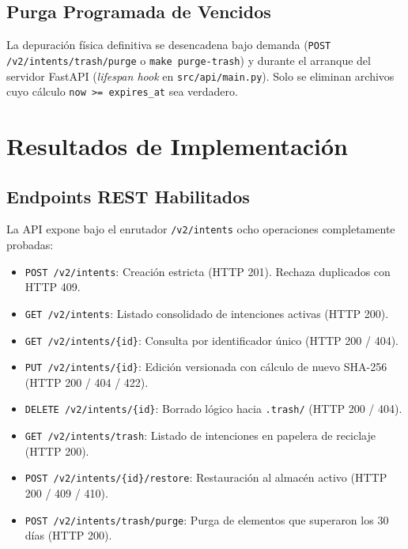 \documentclass[11pt,a4paper]{article}
\begin{document}
\subsection{Purga Programada de Vencidos}
La depuración física definitiva se desencadena bajo demanda (\texttt{POST /v2/intents/trash/purge} o \texttt{make purge-trash}) y durante el arranque del servidor FastAPI (\textit{lifespan hook} en \texttt{src/api/main.py}). Solo se eliminan archivos cuyo cálculo \texttt{now >= expires\_at} sea verdadero.

\section{Resultados de Implementación}

\subsection{Endpoints REST Habilitados}
La API expone bajo el enrutador \texttt{/v2/intents} ocho operaciones completamente probadas:
\begin{itemize}[itemsep=1pt]
    \item \texttt{POST /v2/intents}: Creación estricta (HTTP 201). Rechaza duplicados con HTTP 409.
    \item \texttt{GET /v2/intents}: Listado consolidado de intenciones activas (HTTP 200).
    \item \texttt{GET /v2/intents/\{id\}}: Consulta por identificador único (HTTP 200 / 404).
    \item \texttt{PUT /v2/intents/\{id\}}: Edición versionada con cálculo de nuevo SHA-256 (HTTP 200 / 404 / 422).
    \item \texttt{DELETE /v2/intents/\{id\}}: Borrado lógico hacia \texttt{.trash/} (HTTP 200 / 404).
    \item \texttt{GET /v2/intents/trash}: Listado de intenciones en papelera de reciclaje (HTTP 200).
    \item \texttt{POST /v2/intents/\{id\}/restore}: Restauración al almacén activo (HTTP 200 / 409 / 410).
    \item \texttt{POST /v2/intents/trash/purge}: Purga de elementos que superaron los 30 días (HTTP 200).
\end{itemize}
\end{document}
